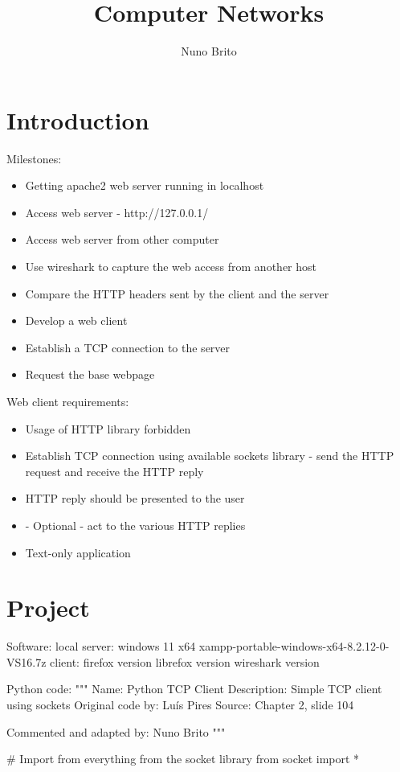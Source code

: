 \documentclass[11pt]{report}
\title{Computer Networks}
\author{Nuno Brito}
\begin{document}
\tableofcontents

\section{Introduction}
Milestones:
\begin{itemize}
    \item Getting apache2 web server running in localhost
    \item Access web server - http://127.0.0.1/
    \item Access web server from other computer
    \item Use wireshark to capture the web access from another host
    \item Compare the HTTP headers sent by the client and the server
    \item Develop a web client
    \item Establish a TCP connection to the server
    \item Request the base webpage
\end{itemize}

Web client requirements:
\begin{itemize}
    \item Usage of HTTP library forbidden
    \item Establish TCP connection using available sockets library - send the HTTP request and receive the HTTP reply
    \item HTTP reply should be presented to the user
    \item - Optional - act to the various HTTP replies
    \item Text-only application
\end{itemize}

\section{Project}
Software:
    local server:
        windows 11 x64
        xampp-portable-windows-x64-8.2.12-0-VS16.7z
    client:
        firefox version
        librefox version
        wireshark version

Python code:
    """
    Name: Python TCP Client
    Description: Simple TCP client using sockets
    Original code by: Luís Pires
    Source: Chapter 2, slide 104
    
    Commented and adapted by: Nuno Brito
    """
    
    # Import from everything from the socket library
    from socket import *
    
\end{document}
